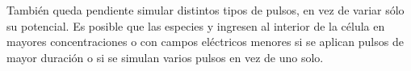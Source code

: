 \documentclass[a4paper,10pt]{article}
\begin{document}
También queda pendiente simular distintos tipos de pulsos, en vez de variar sólo su potencial. Es posible que las especies \na y \cl ingresen al interior de la célula en mayores concentraciones o con campos eléctricos menores si se aplican pulsos de mayor duración o si se simulan varios pulsos en vez de uno solo. \\
\end{document}
